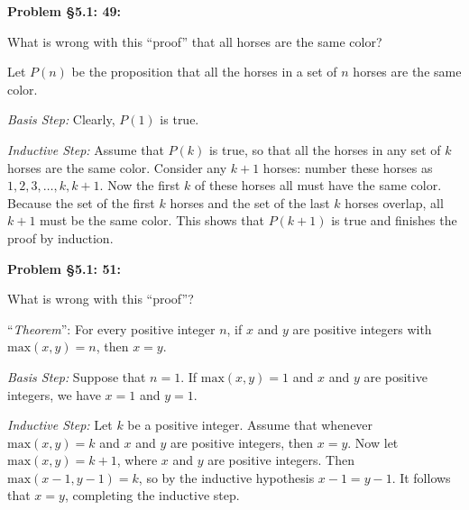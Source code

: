\documentclass{article}
\newenvironment{problem}[1]
    {\begin{mdframed}[default]
    \textbf{Problem #1:}
    }
    {\end{mdframed}
    }
\begin{document}
\begin{problem}{\S 5.1: 49}
What is wrong with this ``proof'' that all horses are the same color?

\vspace{3mm}
\noindent Let $P(n)$ be the proposition that all the horses in a set of $n$ horses are the same color.

\vspace{2mm}
\noindent \emph{Basis Step:} Clearly, $P(1)$ is true.

\vspace{2mm}
\noindent \emph{Inductive Step:} Assume that $P(k)$ is true, so that all the horses in any set of $k$ horses are the same color. Consider any $k+1$ horses: number these horses as $1, 2, 3, \dots, k, k+1$. Now the first $k$ of these horses all must have the same color. Because the set of the first $k$ horses and the set of the last $k$ horses overlap, all $k+1$ must be the same color. This shows that $P(k+1)$ is true and finishes the proof by induction.
\end{problem}

\begin{problem}{\S 5.1: 51}
What is wrong with this ``proof''?

\vspace{3mm}
\noindent ``\emph{Theorem}'': For every positive integer $n$, if $x$ and $y$ are positive integers with $\textrm{max}(x,y) = n$, then $x = y$.

\vspace{2mm}
\noindent \emph{Basis Step:} Suppose that $n=1$. If $\textrm{max}(x,y)=1$ and $x$ and $y$ are positive integers, we have $x = 1$ and $y = 1$.

\vspace{2mm}
\noindent \emph{Inductive Step:} Let $k$ be a positive integer. Assume that whenever $\textrm{max}(x,y) = k$ and $x$ and $y$ are positive integers, then $x = y$. Now let $\textrm{max}(x,y) = k+1$, where $x$ and $y$ are positive integers. Then $\textrm{max}(x-1,y-1) = k$, so by the inductive hypothesis $x-1 = y-1$. It follows that $x = y$, completing the inductive step.
\end{problem}
\end{document}
